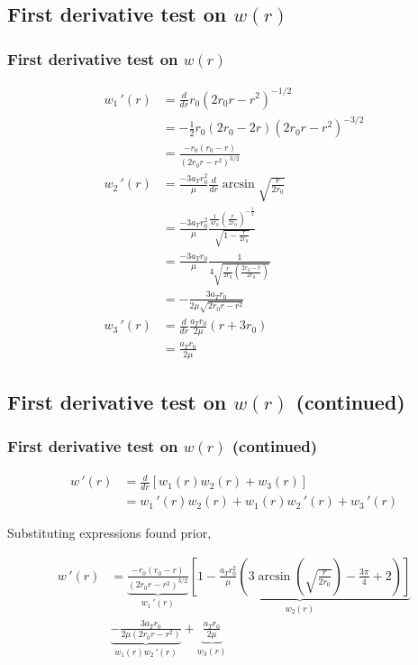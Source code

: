 \documentclass{beamer}
\newcommand{\sectit}[1]{
    \section{\texorpdfstring{#1}{}}
    \frametitle{\texorpdfstring{#1}{}}
}
\begin{document}
\begin{frame}
    \sectit{First derivative test on $w(r)$}

    {\tiny\begin{align}
        w_1\,'(r)&=\frac{d}{dr}r_0(2r_0r-r^2)^{-1/2}\\
        &=-\frac{1}{2}r_0(2r_0-2r)(2r_0r-r^2)^{-3/2}\\
        &=\frac{-r_0(r_0-r)}{(2r_0r-r^2)^{3/2}}\\
        w_2\,'(r)&=\frac{-3a_Tr_0^2}{\mu}\frac{d}{dr}\arcsin \sqrt{\frac{r}{2r_0}}\\
        &=\frac{-3a_Tr_0^2}{\mu}\frac{\frac{1}{4r_0}(\frac{r}{2r_0})^{-\frac{1}{2}}}{\sqrt{1-\frac{r}{2r_0}}}\\
        &=\frac{-3a_Tr_0}{\mu}\frac{1}{4\sqrt{\frac{r}{2r_0}(\frac{2r_0-r}{2r_0})}}\\
        &=-\frac{3a_Tr_0}{2\mu\sqrt{2r_0r-r^2}}\\
        w_3\,'(r)&=\frac{d}{dr}\frac{a_Tr_0}{2\mu}(r+3r_0)\\
        &=\frac{a_Tr_0}{2\mu}
    \end{align}}
\end{frame}

\begin{frame}
    \sectit{First derivative test on $w(r)$ (continued)}

    \begin{align}
        w\,'(r)&=\frac{d}{dr}\left[w_1(r)w_2(r)+w_3(r)\right]\\
        &=w_1\,'(r)w_2(r)+w_1(r)w_2\,'(r)+w_3\,'(r)
    \end{align}

    Substituting expressions found prior,

    {\scriptsize\begin{align}
        w\,'(r)&=\underbrace{\frac{-r_0(r_0-r)}{(2r_0r-r^2)^{3/2}}}_{w_1\,'(r)}\underbrace{\left[1-\frac{a_Tr_0^2}{\mu}\left(3\arcsin(\sqrt{\frac{r}{2r_0}})-\frac{3\pi}{4}+2\right)\right]}_{w_2(r)}\\
        &\underbrace{-\frac{3a_Tr_{0}}{2\mu\left(2 r_{0}r-r^2\right)}}_{w_1(r)w_2\,'(r)}+\underbrace{\frac{a_Tr_0}{2\mu}}_{w_3(r)}
    \end{align}}

\end{frame}
\end{document}
